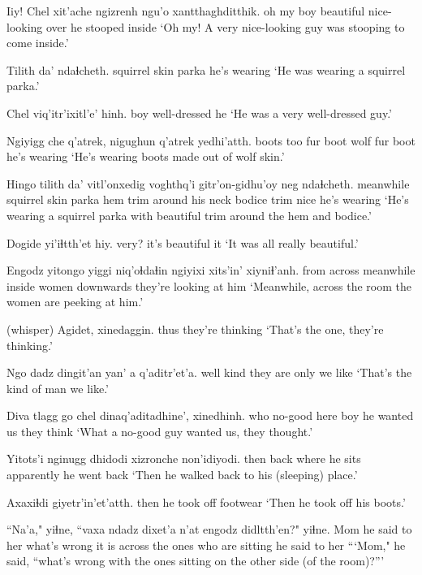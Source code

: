 \documentclass[12pt]{article}
\begin{document}
\gll Iiy! Chel xit'ache ngizrenh ngu'o     xantthaghditthik.
{oh my} boy  beautiful nice-looking over {he stooped inside}
\glt `Oh my! A very nice-looking guy was stooping to come inside.'
\glend

\gll Tilith da' ndaɬcheth.
{squirrel skin} parka {he's wearing}
\glt `He was wearing a squirrel parka.'
\glend

\gll Chel viq'itr'ixitl'e' hinh.
boy  well-dressed    he
\glt `He was a very well-dressed guy.'
\glend

\gll Ngiyigg che q'atrek, nigughun q'atrek yedhi'atth.
boots   too {fur boot}      wolf     {fur boot}     {he's wearing}
\glt `He's wearing boots made out of wolf skin.'
\glend

\gll Hingo     tilith da'    vitl'onxedig   voghthq'i       gitr'on-gidhu'oy neg  ndaɬcheth.
meanwhile {squirrel skin} parka {hem trim} {around his neck} {bodice trim}             nice {he's wearing }
\glt `He's wearing a squirrel parka with beautiful trim around the hem and bodice.'
\glend

\gll Dogide yi'iɬtth'et hiy.
very?    {it's beautiful}  it
\glt `It was all really beautiful.'
\glend

\gll Engodz      yitongo   yiggi  niq'oɬdaɬin {ngiyixi xits'in'} xiyniɬ'anh.
{from across} meanwhile inside women       downwards        {they're looking at him}
\glt `Meanwhile, across the room the women are peeking at him.'
\glend

(whisper)
\gll Agidet, xinedaggin.
thus      {they're thinking}
\glt `That's the one, they're thinking.'
\glend

\gll Ngo  dadz dingit'an yan' a q'aditr'et'a.
well kind {they are}  only  {} {we like}
\glt `That's the kind of man we like.'
\glend

\gll Diva tlagg   go   chel dinaq'aditadhine', xinedhinh.
who  no-good here boy  {he wanted us}     {they think}
\glt `What a no-good guy wanted us, they thought.'
\glend

\gll Yitots'i nginugg dhidodi       xizronche non'idiyodi.
then     back    {where he sits}  apparently         {he went back}
\glt `Then he walked back to his (sleeping) place.'
\glend

\gll Axaxiɬdi giyetr'in'et'atth.
then     {he took off footwear}
\glt `Then he took off his boots.'
\glend

\gll ``Na'a," yiɬne, ``vaxa ndadz dixet'a n'at engodz didltth'en?"             yiɬne.
 Mom   {he said to her} what's wrong {it is} {}          across {the ones who are sitting} {he said to her}
\glt ```Mom," he said, ``what's wrong with the ones sitting on the other side (of the room)?'''
\glend
\end{document}
